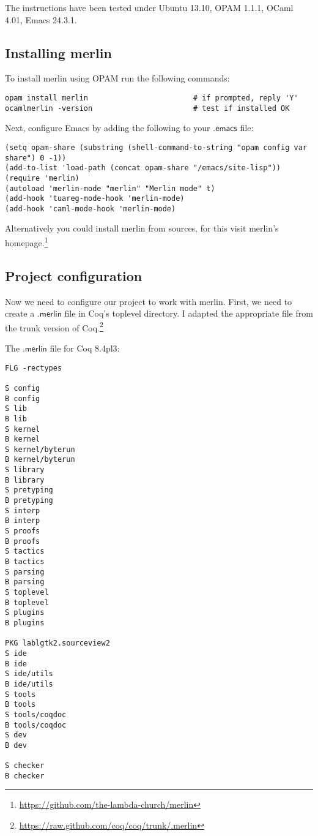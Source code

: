 \documentclass[a4paper,oneside]{book}
\newcommand{\m}[1]{\ensuremath{\mathsf{#1}}}
\begin{document}
The instructions have been tested under Ubuntu 13.10, OPAM 1.1.1,
OCaml 4.01, Emacs 24.3.1. 

\subsection{Installing merlin}

To install merlin using OPAM run the following commands:
\begin{lstlisting}
opam install merlin                        # if prompted, reply 'Y'
ocamlmerlin -version                       # test if installed OK
\end{lstlisting}

\noindent
Next, configure Emacs by adding the following to your \m{.emacs} file:
\begin{lstlisting}
(setq opam-share (substring (shell-command-to-string "opam config var share") 0 -1))
(add-to-list 'load-path (concat opam-share "/emacs/site-lisp"))
(require 'merlin)
(autoload 'merlin-mode "merlin" "Merlin mode" t)
(add-hook 'tuareg-mode-hook 'merlin-mode)
(add-hook 'caml-mode-hook 'merlin-mode)
\end{lstlisting}

Alternatively you could install merlin from sources, for this visit
merlin's
homepage.\footnote{\url{https://github.com/the-lambda-church/merlin}}

\subsection{Project configuration}

Now we need to configure our project to work with merlin.  First, we
need to create a \m{.merlin} file in Coq's toplevel directory. I
adapted the appropriate file from the trunk version of
Coq.\footnote{\url{https://raw.github.com/coq/coq/trunk/.merlin}}

The \m{.merlin} file for Coq 8.4pl3:
\begin{lstlisting}
FLG -rectypes

S config
B config
S lib
B lib
S kernel
B kernel
S kernel/byterun
B kernel/byterun
S library
B library
S pretyping
B pretyping
S interp
B interp
S proofs
B proofs
S tactics
B tactics
S parsing
B parsing
S toplevel
B toplevel
S plugins
B plugins

PKG lablgtk2.sourceview2
S ide
B ide
S ide/utils
B ide/utils
S tools
B tools
S tools/coqdoc
B tools/coqdoc
S dev
B dev

S checker
B checker
\end{lstlisting}
\end{document}
